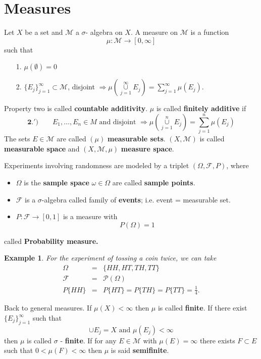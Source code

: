 \documentclass[12pt]{report}
\newtheorem{example}[theorem]{Example}
\begin{document}
\section{Measures}

\vspace{.15cm}
\noindent Let $X$ be a set and $\mathcal{M}$ a $\sigma$- algebra on $X$.  A
measure on $\mathcal{M}$ is a function
\[
\mu: \mathcal{M} \longrightarrow [0, \infty]
\] such that

\begin{itemize}
\item[1.]  $\mu (\emptyset) = 0$
\item[2.]  $\{E_j\}^\infty_{j=1} \subset \mathcal{M}$, disjoint
$\Longrightarrow \mu \left ( \overset{\infty}{\underset{j=1}{\cup}}
 E_j\right ) =
\sum^\infty_{j=1} \mu (E_j).$
\end{itemize} Property two is called {\bf countable additivity}.  $\mu$
is called {\bf finitely additive} if
\[ 
\mathbf{2}.') \qquad E_1, \dots , E_n\in M \mbox{ and disjoint }
\Longrightarrow \mu \left (\overset{n}{\underset{j=1}{\cup}}  E_j
\right ) = \sum^n_{j=1}
\mu(E_j) \] The sets $E \in \mathcal{M}$ are called $(\mu)$ {\bf
measurable sets}.  $(X,
\mathcal{M})$ is called {\bf measurable space} and $(X, \mathcal{M},
\mu)$ {\bf measure space}.


\vspace{.25cm}
  Experiments involving
randomness are modeled by a triplet $(\Omega, \mathcal{F}, P)$, where
\begin{itemize}
\item  $\Omega$ is the {\bf sample space} $ \omega \in
\Omega$ are called {\bf sample points}.
\item $\mathcal{F}$ is a $\sigma$-algebra called family of {\bf
events};  i.e. event = measurable set.
\item$P: \mathcal{F} \longrightarrow [0, 1]$ is a measure with
\[ P(\Omega) = 1
\]
\end{itemize} called {\bf Probability measure.}

\begin{example}  For the experiment of tossing a coin twice, we can take
\begin{eqnarray*}
\Omega &=& \{HH, HT, TH, TT\}\\
\mathcal{F} &=& \mathcal{P} (\Omega)\\ P \{HH\} &=& P\{HT\} = P\{TH\} =
P\{TT\} = \frac{1}{4}.
\end{eqnarray*}
\end{example} Back to general measures.  If $\mu(X) < \infty$ then $\mu$ is
called {\bf finite}. If there  exist $\{E_j\}^\infty_{j=1}$ such that
\[
\cup E_j = X \mbox{ and } \mu (E_j) < \infty
\] then $\mu$ is called $ \sigma$ - {\bf finite}.  If for any $E
\in \mathcal{M}$ with $\mu(E) = \infty$ there exists $F \subset E $ such
that $0 < \mu(F) < \infty$ then $\mu$ is said {\bf semifinite}.
\end{document}
